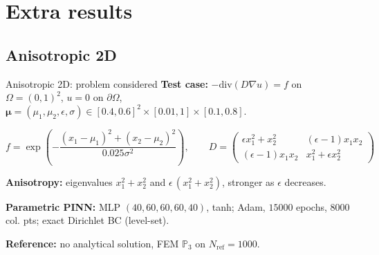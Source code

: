 

\section{Extra results}

\subsection{Anisotropic 2D}

\begin{frame}{Anisotropic 2D: problem considered}
	\setlength{\plotwidth}{0.38\textwidth}\setlength{\plotheight}{0.27\textwidth}
	\textbf{Test case:} $-\text{div}(D\nabla u)=f$ on $\Omega=(0,1)^2$, $u=0$ on $\partial\Omega$, $\bm{\mu}=(\mu_1,\mu_2,\epsilon,\sigma)\in[0.4,0.6]^2\times[0.01,1]\times[0.1,0.8]$.

	\vspace{-4pt}
	\[
		f=\exp\left(-\frac{(x_1-\mu_1)^2+(x_2-\mu_2)^2}{0.025\sigma^2}\right), \qquad
		D=\begin{pmatrix}
			\epsilon x_1^2+x_2^2 & (\epsilon-1)x_1x_2   \\
			(\epsilon-1)x_1x_2   & x_1^2+\epsilon x_2^2
		\end{pmatrix}
	\]

	\vspace{-2pt}
	\textbf{Anisotropy:} eigenvalues $x_1^2+x_2^2$ and $\epsilon\,(x_1^2+x_2^2)$, stronger as $\epsilon$ decreases.

	\vspace{6pt}
	\textbf{Parametric PINN:} MLP $(40,60,60,60,40)$, tanh; Adam, $15000$ epochs, $8000$ col. pts; exact Dirichlet BC (level-set).

	\vspace{6pt}
	\textbf{Reference:} no analytical solution, FEM $\mathbb{P}_3$ on $N_\text{ref}=1000$.
\end{frame}

